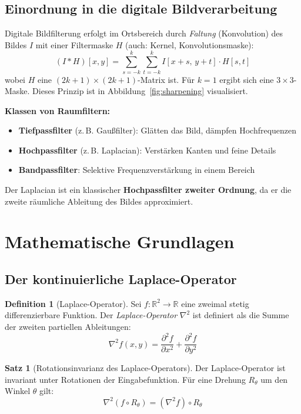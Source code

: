 ﻿\documentclass[a4paper,12pt]{article}
\theoremstyle{definition}
\newtheorem{definition}{Definition}
\newtheorem{satz}{Satz}
\begin{document}
\subsection{Einordnung in die digitale Bildverarbeitung}

Digitale Bildfilterung erfolgt im Ortsbereich durch \emph{Faltung} (Konvolution) des Bildes $I$
mit einer Filtermaske $H$ (auch: Kernel, Konvolutionsmaske):
\[
    (I * H)[x,y] = \sum_{s=-k}^{k} \sum_{t=-k}^{k} I[x+s,\, y+t] \cdot H[s,t]
\]
wobei $H$ eine $(2k{+}1) \times (2k{+}1)$-Matrix ist. Für $k=1$ ergibt sich eine $3\times3$-Maske.
Dieses Prinzip ist in Abbildung~\ref{fig:sharpening} visualisiert.

\textbf{Klassen von Raumfiltern:}
\begin{itemize}
    \item \textbf{Tiefpassfilter} (z.\,B. Gaußfilter): Glätten das Bild, dämpfen Hochfrequenzen
    \item \textbf{Hochpassfilter} (z.\,B. Laplacian): Verstärken Kanten und feine Details
    \item \textbf{Bandpassfilter}: Selektive Frequenzverstärkung in einem Bereich
\end{itemize}
Der Laplacian ist ein klassischer \textbf{Hochpassfilter zweiter Ordnung}, da er die zweite
räumliche Ableitung des Bildes approximiert.

\section{Mathematische Grundlagen}

\subsection{Der kontinuierliche Laplace-Operator}

\begin{definition}[Laplace-Operator]
    Sei $f: \mathbb{R}^2 \to \mathbb{R}$ eine zweimal stetig differenzierbare Funktion.
    Der \emph{Laplace-Operator} $\nabla^2$ ist definiert als die Summe der zweiten partiellen
    Ableitungen:
    \[
        \nabla^2 f(x,y) = \frac{\partial^2 f}{\partial x^2} + \frac{\partial^2 f}{\partial y^2}
    \]
\end{definition}

\begin{satz}[Rotationsinvarianz des Laplace-Operators]
\label{satz:rotinv}
    Der Laplace-Operator ist invariant unter Rotationen der Eingabefunktion. Für eine Drehung
    $R_\theta$ um den Winkel $\theta$ gilt:
    \[
        \nabla^2 (f \circ R_\theta) = (\nabla^2 f) \circ R_\theta
    \]
\end{satz}
\end{document}

